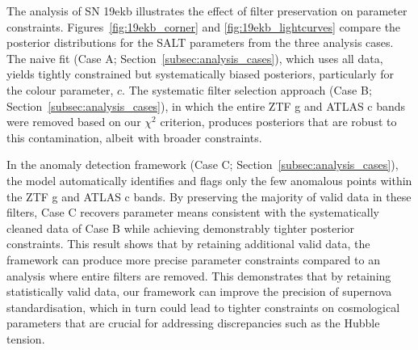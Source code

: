 The analysis of SN 19ekb illustrates the effect of filter preservation on parameter constraints. Figures~\ref{fig:19ekb_corner} and \ref{fig:19ekb_lightcurves} compare the posterior distributions for the SALT parameters from the three analysis cases. The naive fit (Case A; Section~\ref{subsec:analysis_cases}), which uses all data, yields tightly constrained but systematically biased posteriors, particularly for the colour parameter, $c$. The systematic filter selection approach (Case B; Section~\ref{subsec:analysis_cases}), in which the entire ZTF g and ATLAS c bands were removed based on our $\chi^2$ criterion, produces posteriors that are robust to this contamination, albeit with broader constraints.

In the anomaly detection framework (Case C; Section~\ref{subsec:analysis_cases}), the model automatically identifies and flags only the few anomalous points within the ZTF g and ATLAS c bands. By preserving the majority of valid data in these filters, Case C recovers parameter means consistent with the systematically cleaned data of Case B while achieving demonstrably tighter posterior constraints. This result shows that by retaining additional valid data, the framework can produce more precise parameter constraints compared to an analysis where entire filters are removed. This demonstrates that by retaining statistically valid data, our framework can improve the precision of supernova standardisation, which in turn could lead to tighter constraints on cosmological parameters that are crucial for addressing discrepancies such as the Hubble tension.


